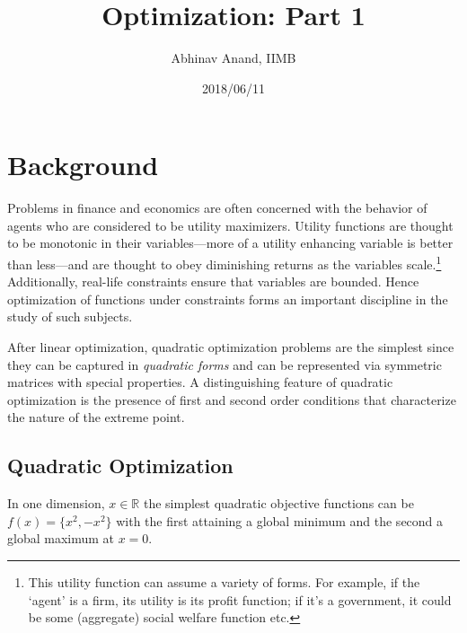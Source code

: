 \documentclass[11pt,]{article}
\title{Optimization: Part 1}
\author{Abhinav Anand, IIMB}
\date{2018/06/11}
\let\rmarkdownfootnote\footnote%
\def\footnote{\protect\rmarkdownfootnote}
\begin{document}
\maketitle

\section{Background}\label{background}

Problems in finance and economics are often concerned with the behavior
of agents who are considered to be utility maximizers. Utility functions
are thought to be monotonic in their variables---more of a utility
enhancing variable is better than less---and are thought to obey
diminishing returns as the variables scale.\footnote{This utility
  function can assume a variety of forms. For example, if the `agent' is
  a firm, its utility is its profit function; if it's a government, it
  could be some (aggregate) social welfare function etc.} Additionally,
real-life constraints ensure that variables are bounded. Hence
optimization of functions under constraints forms an important
discipline in the study of such subjects.

After linear optimization, quadratic optimization problems are the
simplest since they can be captured in \emph{quadratic forms} and can be
represented via symmetric matrices with special properties. A
distinguishing feature of quadratic optimization is the presence of
first and second order conditions that characterize the nature of the
extreme point.

\subsection{Quadratic Optimization}\label{quadratic-optimization}

In one dimension, \(x\in \mathbb{R}\) the simplest quadratic objective
functions can be \(f(x)=\{x^2, -x^2\}\) with the first attaining a
global minimum and the second a global maximum at \(x=0\).
\end{document}
